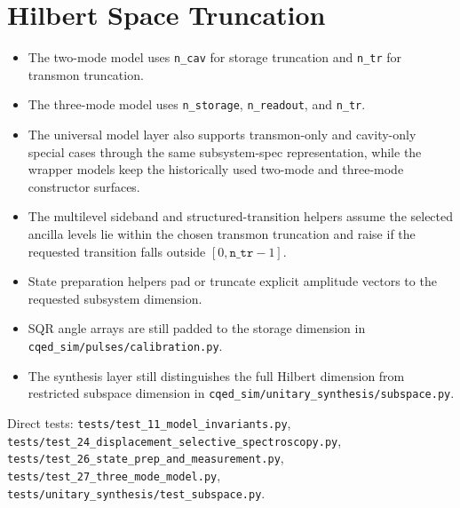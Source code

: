 \documentclass[11pt]{article}
\begin{document}
\section{Hilbert Space Truncation}
\begin{itemize}[leftmargin=1.5em]
  \item The two-mode model uses \texttt{n\_cav} for storage truncation and
  \texttt{n\_tr} for transmon truncation.
  \item The three-mode model uses \texttt{n\_storage}, \texttt{n\_readout}, and
  \texttt{n\_tr}.
  \item The universal model layer also supports transmon-only and cavity-only
  special cases through the same subsystem-spec representation, while the wrapper
  models keep the historically used two-mode and three-mode constructor surfaces.
  \item The multilevel sideband and structured-transition helpers assume the
  selected ancilla levels lie within the chosen transmon truncation and raise if
  the requested transition falls outside \([0,\texttt{n\_tr}-1]\).
  \item State preparation helpers pad or truncate explicit amplitude vectors to
  the requested subsystem dimension.
  \item SQR angle arrays are still padded to the storage dimension in
  \texttt{cqed\_sim/pulses/calibration.py}.
  \item The synthesis layer still distinguishes the full Hilbert dimension from
  restricted subspace dimension in
  \texttt{cqed\_sim/unitary\_synthesis/subspace.py}.
\end{itemize}

\noindent
Direct tests:
\texttt{tests/test\_11\_model\_invariants.py},
\texttt{tests/test\_24\_displacement\_selective\_spectroscopy.py},
\texttt{tests/test\_26\_state\_prep\_and\_measurement.py},
\texttt{tests/test\_27\_three\_mode\_model.py},
\texttt{tests/unitary\_synthesis/test\_subspace.py}.
\end{document}
